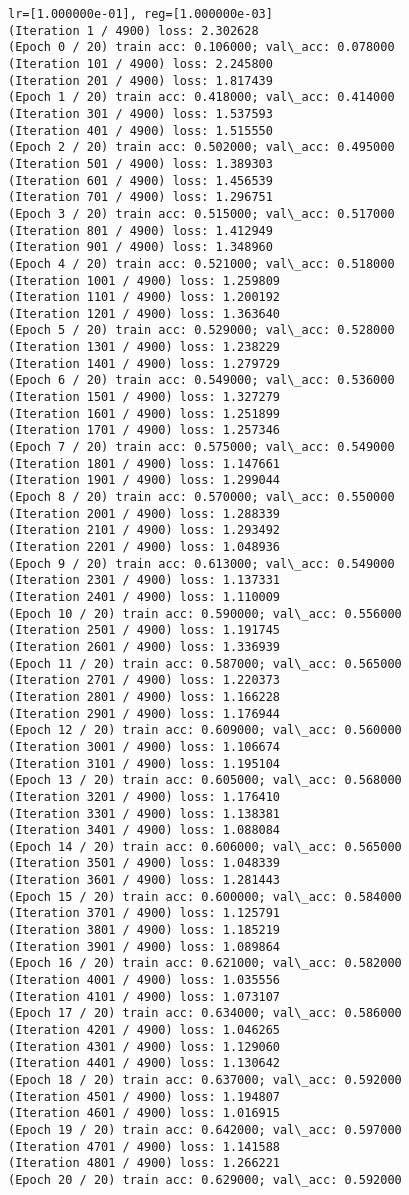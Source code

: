 \documentclass[11pt]{article}
\begin{document}
\begin{Verbatim}[commandchars=\\\{\}]
lr=[1.000000e-01], reg=[1.000000e-03]
(Iteration 1 / 4900) loss: 2.302628
(Epoch 0 / 20) train acc: 0.106000; val\_acc: 0.078000
(Iteration 101 / 4900) loss: 2.245800
(Iteration 201 / 4900) loss: 1.817439
(Epoch 1 / 20) train acc: 0.418000; val\_acc: 0.414000
(Iteration 301 / 4900) loss: 1.537593
(Iteration 401 / 4900) loss: 1.515550
(Epoch 2 / 20) train acc: 0.502000; val\_acc: 0.495000
(Iteration 501 / 4900) loss: 1.389303
(Iteration 601 / 4900) loss: 1.456539
(Iteration 701 / 4900) loss: 1.296751
(Epoch 3 / 20) train acc: 0.515000; val\_acc: 0.517000
(Iteration 801 / 4900) loss: 1.412949
(Iteration 901 / 4900) loss: 1.348960
(Epoch 4 / 20) train acc: 0.521000; val\_acc: 0.518000
(Iteration 1001 / 4900) loss: 1.259809
(Iteration 1101 / 4900) loss: 1.200192
(Iteration 1201 / 4900) loss: 1.363640
(Epoch 5 / 20) train acc: 0.529000; val\_acc: 0.528000
(Iteration 1301 / 4900) loss: 1.238229
(Iteration 1401 / 4900) loss: 1.279729
(Epoch 6 / 20) train acc: 0.549000; val\_acc: 0.536000
(Iteration 1501 / 4900) loss: 1.327279
(Iteration 1601 / 4900) loss: 1.251899
(Iteration 1701 / 4900) loss: 1.257346
(Epoch 7 / 20) train acc: 0.575000; val\_acc: 0.549000
(Iteration 1801 / 4900) loss: 1.147661
(Iteration 1901 / 4900) loss: 1.299044
(Epoch 8 / 20) train acc: 0.570000; val\_acc: 0.550000
(Iteration 2001 / 4900) loss: 1.288339
(Iteration 2101 / 4900) loss: 1.293492
(Iteration 2201 / 4900) loss: 1.048936
(Epoch 9 / 20) train acc: 0.613000; val\_acc: 0.549000
(Iteration 2301 / 4900) loss: 1.137331
(Iteration 2401 / 4900) loss: 1.110009
(Epoch 10 / 20) train acc: 0.590000; val\_acc: 0.556000
(Iteration 2501 / 4900) loss: 1.191745
(Iteration 2601 / 4900) loss: 1.336939
(Epoch 11 / 20) train acc: 0.587000; val\_acc: 0.565000
(Iteration 2701 / 4900) loss: 1.220373
(Iteration 2801 / 4900) loss: 1.166228
(Iteration 2901 / 4900) loss: 1.176944
(Epoch 12 / 20) train acc: 0.609000; val\_acc: 0.560000
(Iteration 3001 / 4900) loss: 1.106674
(Iteration 3101 / 4900) loss: 1.195104
(Epoch 13 / 20) train acc: 0.605000; val\_acc: 0.568000
(Iteration 3201 / 4900) loss: 1.176410
(Iteration 3301 / 4900) loss: 1.138381
(Iteration 3401 / 4900) loss: 1.088084
(Epoch 14 / 20) train acc: 0.606000; val\_acc: 0.565000
(Iteration 3501 / 4900) loss: 1.048339
(Iteration 3601 / 4900) loss: 1.281443
(Epoch 15 / 20) train acc: 0.600000; val\_acc: 0.584000
(Iteration 3701 / 4900) loss: 1.125791
(Iteration 3801 / 4900) loss: 1.185219
(Iteration 3901 / 4900) loss: 1.089864
(Epoch 16 / 20) train acc: 0.621000; val\_acc: 0.582000
(Iteration 4001 / 4900) loss: 1.035556
(Iteration 4101 / 4900) loss: 1.073107
(Epoch 17 / 20) train acc: 0.634000; val\_acc: 0.586000
(Iteration 4201 / 4900) loss: 1.046265
(Iteration 4301 / 4900) loss: 1.129060
(Iteration 4401 / 4900) loss: 1.130642
(Epoch 18 / 20) train acc: 0.637000; val\_acc: 0.592000
(Iteration 4501 / 4900) loss: 1.194807
(Iteration 4601 / 4900) loss: 1.016915
(Epoch 19 / 20) train acc: 0.642000; val\_acc: 0.597000
(Iteration 4701 / 4900) loss: 1.141588
(Iteration 4801 / 4900) loss: 1.266221
(Epoch 20 / 20) train acc: 0.629000; val\_acc: 0.592000
    \end{Verbatim}
\end{document}
